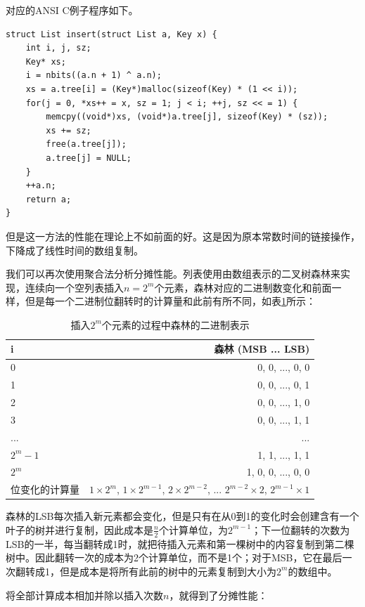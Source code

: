 \documentclass[b5paper]{ctexart}
\begin{document}
对应的ANSI C例子程序如下。

\lstset{language=C}
\begin{lstlisting}
struct List insert(struct List a, Key x) {
    int i, j, sz;
    Key* xs;
    i = nbits((a.n + 1) ^ a.n);
    xs = a.tree[i] = (Key*)malloc(sizeof(Key) * (1 << i));
    for(j = 0, *xs++ = x, sz = 1; j < i; ++j, sz << = 1) {
        memcpy((void*)xs, (void*)a.tree[j], sizeof(Key) * (sz));
        xs += sz;
        free(a.tree[j]);
        a.tree[j] = NULL;
    }
    ++a.n;
    return a;
}
\end{lstlisting}

但是这一方法的性能在理论上不如前面的好。这是因为原本常数时间的链接操作，下降成了线性时间的数组复制。

我们可以再次使用聚合法分析分摊性能。列表使用由数组表示的二叉树森林来实现，连续向一个空列表插入$n = 2^m$个元素，森林对应的二进制数变化和前面一样，但是每一个二进制位翻转时的计算量和此前有所不同，如表\ref{tab:imperative-ralist-insert}所示：

\begin{table}[htbp]
\centering
\begin{tabular}{l | r}
  \hline
  i & 森林 (MSB ... LSB) \\
  \hline
  0 & 0, 0, ..., 0, 0 \\
  1 & 0, 0, ..., 0, 1 \\
  2 & 0, 0, ..., 1, 0 \\
  3 & 0, 0, ..., 1, 1 \\
  ... & ... \\
  $2^m-1$ & 1, 1, ..., 1, 1 \\
  $2^m$ & 1, 0, 0, ..., 0, 0 \\
  \hline
  位变化的计算量 & $1 \times 2^m$, $1 \times 2^{m-1}$, $2 \times 2^{m-2}$, ... $2^{m-2} \times 2$, $2^{m-1} \times 1$ \\
  \hline
\end{tabular}
\caption{插入$2^m$个元素的过程中森林的二进制表示} \label{tab:imperative-ralist-insert}
\end{table}

森林的LSB每次插入新元素都会变化，但是只有在从0到1的变化时会创建含有一个叶子的树并进行复制，因此成本是$\frac{n}{2}$个计算单位，为$2^{m-1}$；下一位翻转的次数为LSB的一半，每当翻转成1时，就把待插入元素和第一棵树中的内容复制到第二棵树中。因此翻转一次的成本为2个计算单位，而不是1个；对于MSB，它在最后一次翻转成1，但是成本是将所有此前的树中的元素复制到大小为$2^m$的数组中。

将全部计算成本相加并除以插入次数$n$，就得到了分摊性能：
\end{document}

